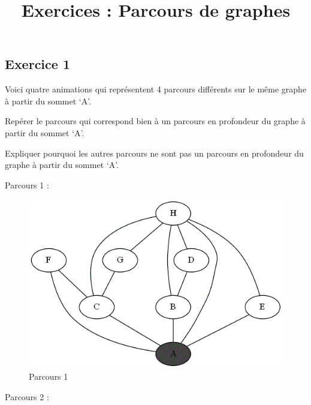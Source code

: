 \documentclass[
  a4paper,
  DIV=11,
  numbers=noendperiod]{scrartcl}
\title{Exercices : Parcours de graphes}
\author{}
\date{}
\begin{document}
\maketitle
\ifdefined\Shaded\renewenvironment{Shaded}{\begin{tcolorbox}[interior hidden, breakable, sharp corners, frame hidden, boxrule=0pt, borderline west={3pt}{0pt}{shadecolor}, enhanced]}{\end{tcolorbox}}\fi

\hypertarget{exercice-1}{%
\subsection{Exercice 1}\label{exercice-1}}

Voici quatre animations qui représentent 4 parcours différents sur le
même graphe à partir du sommet `A'.

Repérer le parcours qui correspond bien à un parcours en profondeur du
graphe à partir du sommet `A'.

Expliquer pourquoi les autres parcours ne sont pas un parcours en
profondeur du graphe à partir du sommet `A'.

Parcours 1 :

\begin{figure}

{\centering \includegraphics{exos_graphes_fiche1_files/mediabag/a2_reperer_profondeu.gif}

}

\caption{Parcours 1}

\end{figure}

Parcours 2 :
\end{document}
